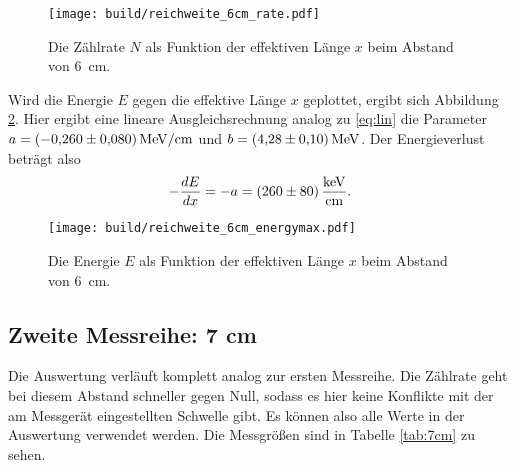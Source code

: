 \begin{figure}[H]
    \centering
    \texttt{[image: build/reichweite\_6cm\_rate.pdf]}
    \caption[]{Die Zählrate $N$ als Funktion der effektiven Länge $x$ beim Abstand von \qty{6}{\cm}.}
    \label{fig:rate_6cm}
\end{figure}

\noindent
Wird die Energie $E$ gegen die effektive Länge $x$ geplottet, ergibt sich Abbildung \ref{fig:energie_6cm}.
Hier ergibt eine lineare Ausgleichsrechnung analog zu \eqref{eq:lin} die Parameter $a = \qty{-0.260 +- 0.080}{\mega\electronvolt\per\cm}$
und $b = \qty{4.28 +- 0.10}{\mega\electronvolt}$.
Der Energieverlust beträgt also 
\begin{align}
    - \frac{dE}{dx} = -a = \qty{260 +- 80}{\kilo\electronvolt\per\cm}.
\end{align}


\begin{figure}[H]
    \centering
    \texttt{[image: build/reichweite\_6cm\_energymax.pdf]}
    \caption[]{Die Energie $E$ als Funktion der effektiven Länge $x$ beim Abstand von \qty{6}{\cm}.}
    \label{fig:energie_6cm}
\end{figure}



\subsection[]{Zweite Messreihe: 7 cm}
Die Auswertung verläuft komplett analog zur ersten Messreihe.
Die Zählrate geht bei diesem Abstand schneller gegen Null, sodass es hier keine Konflikte mit der am Messgerät eingestellten Schwelle gibt.
Es können also alle Werte in der Auswertung verwendet werden.
Die Messgrößen sind in Tabelle \ref{tab:7cm} zu sehen.

